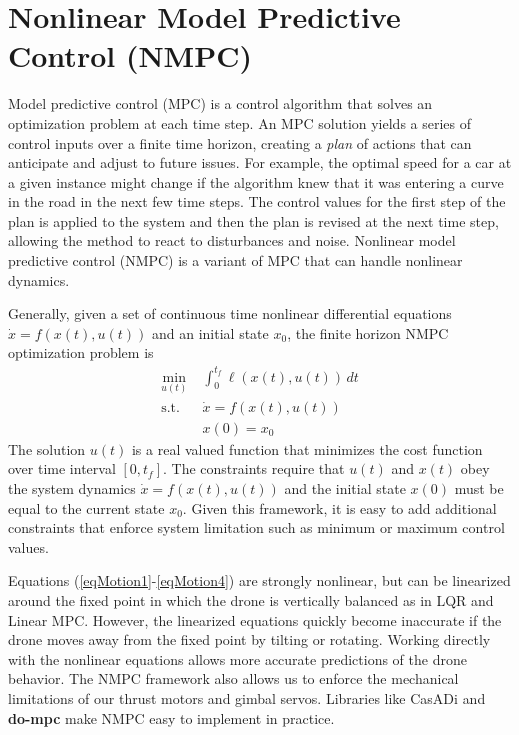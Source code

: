 \documentclass[]{article}
\newcommand{\mpc}{MPC}
\newcommand{\nmpc}{NMPC}
\newcommand{\casadi}{CasADi}
\newcommand{\dompc}{{\bf do-mpc}}
\begin{document}
	


\section*{Nonlinear Model Predictive Control (NMPC)}

	Model predictive control (\mpc)  \citep{mpc} is a control algorithm that solves an optimization problem at each time step.
	An {\mpc} solution yields a series of control inputs over a finite time horizon, creating a {\em plan} of actions that can anticipate and adjust to future issues. For example, the optimal speed for a car at a given instance might change if the algorithm knew that it was entering a curve in the road in the next few time steps. The control values for the first step of the plan is applied to the system and then the plan is revised at the next time step, allowing the method to react to disturbances and noise. Nonlinear model predictive control (\nmpc) is a variant of {\mpc} that can handle nonlinear dynamics. 

	Generally, given a set of continuous time nonlinear differential equations $\dot{x} = f(x(t),u(t))$  and an initial state $x_0$, the finite horizon {\nmpc} optimization problem is
	\begin{align*}
		\min_{u(t)} \; & \int_{0}^{t_f} \ell(x(t),u(t))\,dt  \\
		\text{s.t.} \;\; & \dot{x} =  f(x(t),u(t)) \\
		& x(0) = x_0 
	\end{align*}
	The solution $u(t)$ is a real valued function that minimizes the cost function over time interval $[0, t_f]$. The constraints require that  $u(t)$ and $x(t)$ obey the system dynamics $\dot{x} =  f(x(t),u(t)) $ and the  initial state $x(0)$ must be equal to the current state $x_0$.   Given this framework, it is easy to add additional constraints that enforce system limitation such as minimum or maximum control values.

	 Equations (\ref{eqMotion1}-\ref{eqMotion4}) are strongly nonlinear, but can be linearized around the fixed point in which the drone is vertically balanced as in LQR and Linear {\mpc}.  However, the linearized equations quickly become inaccurate if the drone moves away from the fixed point by tilting or rotating.  Working directly with the nonlinear equations allows more accurate predictions of the drone behavior. The {\nmpc} framework also allows us to enforce the mechanical limitations of our thrust motors and gimbal servos.  Libraries like {\casadi} \citep{casadi} and {\dompc} \citep{do-mpc} make {\nmpc} easy to implement in practice.
 
\end{document}
